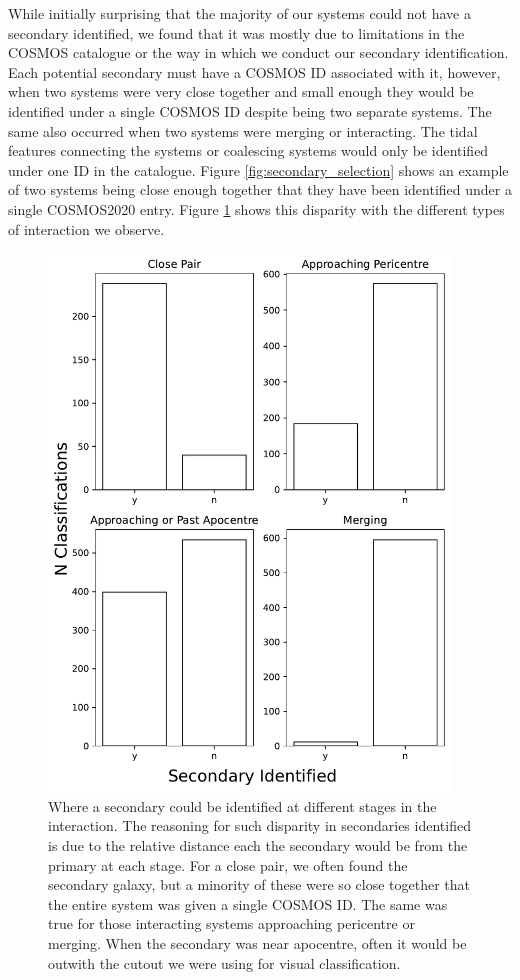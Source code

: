 While initially surprising that the majority of our systems could not have a secondary identified, we found that it was mostly due to limitations in the COSMOS catalogue or the way in which we conduct our secondary identification. Each potential secondary must have a COSMOS ID associated with it, however, when two systems were very close together and small enough they would be identified under a single COSMOS ID despite being two separate systems. The same also occurred when two systems were merging or interacting. The tidal features connecting the systems or coalescing systems would only be identified under one ID in the catalogue. Figure \ref{fig:secondary_selection} shows an example of two systems being close enough together that they have been identified under a single COSMOS2020 entry. Figure \ref{fig:secondaries_found} shows this disparity with the different types of interaction we observe.

\begin{figure}
    \centering
    \includegraphics[width=0.95\textwidth]{Chapter3/figures/visualisation_classification.pdf}
    \caption{Where a secondary could be identified at different stages in the interaction. The reasoning for such disparity in secondaries identified is due to the relative distance each the secondary would be from the primary at each stage. For a close pair, we often found the secondary galaxy, but a minority of these were so close together that the entire system was given a single COSMOS ID. The same was true for those interacting systems approaching pericentre or merging. When the secondary was near apocentre, often it would be outwith the cutout we were using for visual classification.}
    \label{fig:secondaries_found}
\end{figure}

